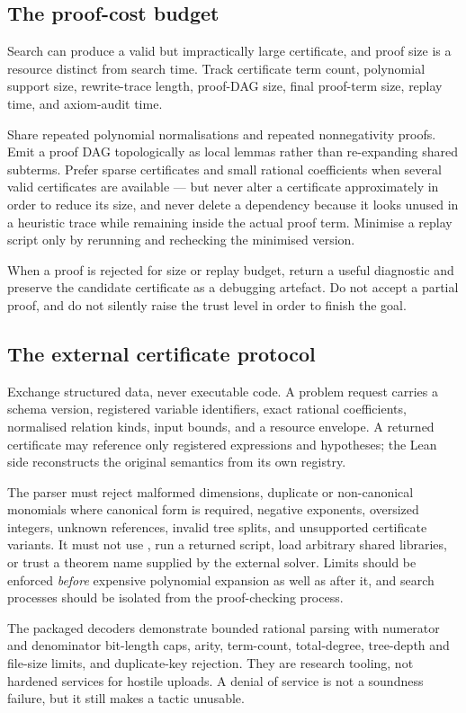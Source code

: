 \subsection{The proof-cost budget}

Search can produce a valid but impractically large certificate, and proof size
is a resource distinct from search time. Track certificate term count,
polynomial support size, rewrite-trace length, proof-DAG size, final proof-term
size, replay time, and axiom-audit time.

Share repeated polynomial normalisations and repeated nonnegativity proofs.
Emit a proof DAG topologically as local lemmas rather than re-expanding shared
subterms. Prefer sparse certificates and small rational coefficients when
several valid certificates are available --- but never alter a certificate
approximately in order to reduce its size, and never delete a dependency
because it looks unused in a heuristic trace while remaining inside the actual
proof term. Minimise a replay script only by rerunning and rechecking the
minimised version.

When a proof is rejected for size or replay budget, return a useful \unknown{}
diagnostic and preserve the candidate certificate as a debugging artefact. Do
not accept a partial proof, and do not silently raise the trust level in order
to finish the goal.

\subsection{The external certificate protocol}

Exchange structured data, never executable code. A problem request carries a
schema version, registered variable identifiers, exact rational coefficients,
normalised relation kinds, input bounds, and a resource envelope. A returned
certificate may reference only registered expressions and hypotheses; the Lean
side reconstructs the original semantics from its own registry.

The parser must reject malformed dimensions, duplicate or non-canonical
monomials where canonical form is required, negative exponents, oversized
integers, unknown references, invalid tree splits, and unsupported certificate
variants. It must not use , run a returned script, load arbitrary
shared libraries, or trust a theorem name supplied by the external solver.
Limits should be enforced \emph{before} expensive polynomial expansion as well
as after it, and search processes should be isolated from the proof-checking
process.

The packaged decoders demonstrate bounded rational parsing with numerator and
denominator bit-length caps, arity, term-count, total-degree, tree-depth and
file-size limits, and duplicate-key rejection. They are research tooling, not
hardened services for hostile uploads. A denial of service is not a soundness
failure, but it still makes a tactic unusable.
